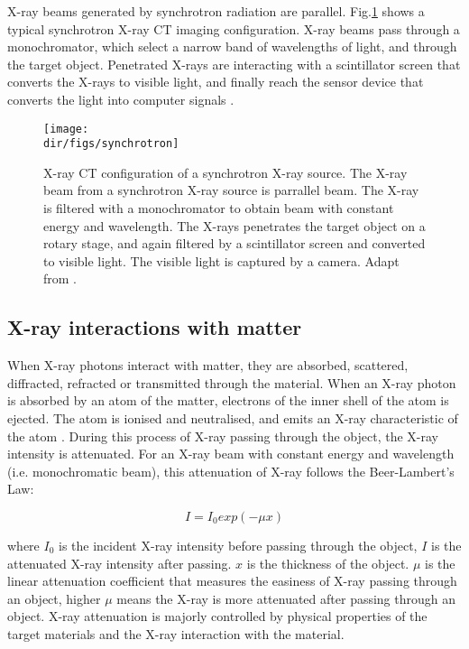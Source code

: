 X-ray beams generated by synchrotron radiation are parallel.  Fig.\ref{synchrotron} shows a typical synchrotron X-ray CT imaging configuration. X-ray beams pass through a monochromator, which select a narrow band of wavelengths of light, and through the target object. Penetrated X-rays are interacting with a scintillator screen that converts the X-rays to visible light, and finally reach the sensor device that converts the light into computer signals \citep{wildenschild2013x}.

\begin{figure}[htbp]
  \centering
  \texttt{[image: \\dir/figs/synchrotron]}
  \caption{X-ray CT configuration of a synchrotron X-ray source. The X-ray beam from a synchrotron X-ray source is parrallel beam. The X-ray is filtered with a monochromator to obtain beam with constant energy and wavelength. The X-rays penetrates the target object on a rotary stage, and again filtered by a scintillator screen and converted to visible light. The visible light is captured by a camera. Adapt from \citet{wildenschild2013x}.}
  \label{synchrotron}
\end{figure}



\subsection{X-ray interactions with matter}
When X-ray photons interact with matter, they are absorbed, scattered, diffracted, refracted or transmitted through the material. When an X-ray photon is absorbed by an atom of the matter, electrons of the inner shell of the atom is ejected. The atom is ionised and neutralised, and emits an X-ray characteristic of the atom \citep{wildenschild2013x}. During this process of X-ray passing through the object, the X-ray intensity is attenuated. For an X-ray beam with constant energy and wavelength (i.e. monochromatic beam), this attenuation of X-ray follows the Beer-Lambert's Law:

\begin{equation}
    I=I_0exp(-\mu x)
\end{equation}

where $I_0$ is the incident X-ray intensity before passing through the object, $I$ is the attenuated X-ray intensity after passing. $x$ is the thickness of the object. $\mu$ is the linear attenuation coefficient that measures the easiness of X-ray passing through an object, higher $\mu$ means the X-ray is more attenuated after passing through an object. X-ray attenuation is majorly controlled by physical properties of the target materials and the X-ray interaction with the material. 

